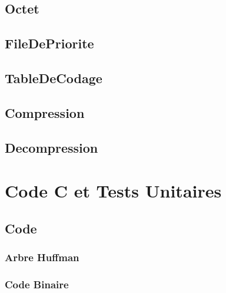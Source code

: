 \documentclass{article}
\begin{document}
\subsection{\textbf{Octet}}



\subsection{\textbf{FileDePriorite}}



\subsection{\textbf{TableDeCodage}}



\subsection{\textbf{Compression}}

%

\subsection{\textbf{Decompression}}

%

\newpage

\section{Code C et Tests Unitaires}

\subsection{Code}
\subsubsection{\textbf{Arbre Huffman}}


\subsubsection{\textbf{Code Binaire}}

\end{document}
